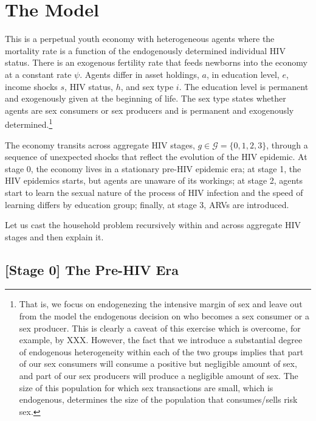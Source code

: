 
\renewcommand{\baselinestretch}{1.3}
\onehalfspace

\section{The Model}

This is a perpetual youth economy with heterogeneous agents where the mortality rate is a function of the endogenously determined individual HIV status. There is an exogenous fertility rate that feeds newborns into the economy at a constant rate $\psi$. Agents differ in asset holdings, $a$, in education level, $e$, income shocks $s$, HIV status, $h$, and sex type $i$. The education level is permanent and exogenously given at the beginning of life. The sex type states whether agents are sex consumers or sex producers and is permanent and exogenously determined.\footnote{\sf That is, we focus on endogenezing the intensive margin of sex and leave out from the model the endogenous decision on who becomes a sex consumer or a sex producer. This is clearly a caveat of this exercise which is overcome, for example, by XXX. However, the fact that we introduce a substantial degree of endogenous heterogeneity within each of the two groups implies that part of our sex consumers will consume a positive but negligible amount of sex, and part of our sex producers will produce a negligible amount of sex. The size of this population for which sex transactions are small, which is endogenous, determines the size of the population that consumes/sells risk sex.}

The economy transits across aggregate HIV stages, $g \in \mathcal{G} =\{0,1,2,3\}$, through a sequence of unexpected shocks that reflect the evolution of the HIV epidemic. At stage 0, the economy lives in a stationary pre-HIV epidemic era; at stage 1, the HIV epidemics starts, but agents are unaware of its workings; at stage 2, agents start to learn the sexual nature of the process of HIV infection and the speed of learning differs by education group; finally, at stage 3, ARVs are introduced.


Let us cast the household problem recursively within and across aggregate HIV stages and then explain it. 

\subsection*{[Stage 0] The Pre-HIV Era}\label{sec:stage0}

